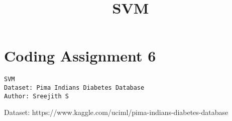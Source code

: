 \documentclass[11pt]{article}
\title{SVM}
\begin{document}
    
    \maketitle
    
    

    
    \hypertarget{coding-assignment-6}{%
\section{Coding Assignment 6}\label{coding-assignment-6}}

\begin{verbatim}
SVM
Dataset: Pima Indians Diabetes Database
Author: Sreejith S
\end{verbatim}

Dataset: https://www.kaggle.com/uciml/pima-indians-diabetes-database
\end{document}
